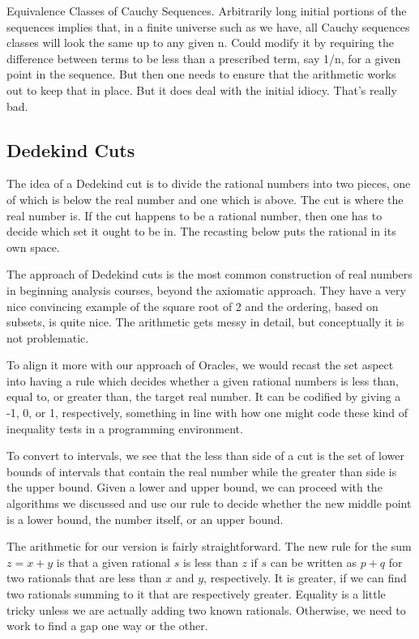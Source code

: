 \documentclass[12pt]{article}
\theoremstyle{remark}
\begin{document}
Equivalence Classes of Cauchy Sequences. Arbitrarily long initial portions
  of the sequences implies that, in a finite universe such as we have, all
  Cauchy sequences classes will look the same up to any given n. Could modify
  it by requiring the difference between terms to be less than a prescribed
  term, say 1/n, for a given point in the sequence. But then one needs to
  ensure that the arithmetic works out to keep that in place. But it does deal
  with the initial idiocy. That's really bad. 
  
\subsection{Dedekind Cuts}

The idea of a Dedekind cut is to divide the rational numbers into two pieces, one of which is below the real number and one which is above. The cut is where the real number is. If the cut happens to be a rational number, then one has to decide which set it ought to be in. The recasting below puts the rational in its own space. 

The approach of Dedekind cuts is the most common construction of real numbers in beginning analysis courses, beyond the axiomatic approach. They have a very nice convincing example of the square root of 2 and the ordering, based on subsets, is quite nice. The arithmetic gets messy in detail, but conceptually it is not problematic. 

To align it more with our approach of Oracles, we would recast the set aspect into having a rule which decides whether a given rational numbers is less than, equal to, or greater than, the target real number. It can be codified by giving a -1, 0, or 1,  respectively, something in line with how one might code these kind of inequality tests in a programming environment. 

To convert to intervals, we see that the less than side of a cut is the set of lower bounds of intervals that contain the real number while the greater than side is the upper bound. Given a lower and upper bound, we can proceed with the algorithms we discussed and use our rule to decide whether the new middle point is a lower bound, the number itself, or an upper bound. 

The arithmetic for our version is fairly straightforward. The new rule for the sum  $z = x+y$ is that a given rational $s$ is less than $z$ if $s$ can be written as $p+q$ for two rationals that are less than $x$ and $y$, respectively. It is greater, if we can find two rationals summing to it that are respectively greater. Equality is a little tricky unless we are actually adding two known rationals. Otherwise, we need to work to find a gap one way or the other. 
\end{document}

